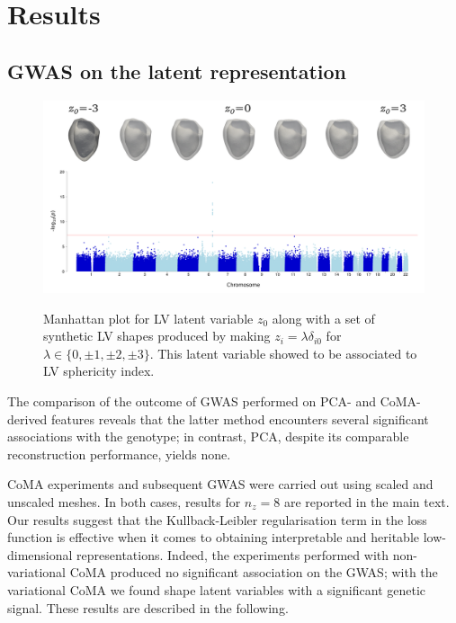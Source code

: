 \section*{Results}
\subsection*{GWAS on the latent representation}
\label{subsec_GWAS}

\begin{figure}[ht!]
\includegraphics[width=\textwidth]{figs/gwas/GWAS_Experiment1_z0_scaled_meshes.png}
\label{fig:manhattan_LV_latent}
\caption{Manhattan plot for LV latent variable $z_0$ along with a set of synthetic LV shapes produced by making $z_i=\lambda \delta_{i0}$ for $\lambda\in\{0, \pm 1, \pm 2, \pm 3\}$. This latent variable showed to be associated to LV sphericity index.}
\end{figure}

The comparison of the outcome of GWAS performed on PCA- and CoMA-derived features reveals that the latter method encounters several significant associations with the genotype; in contrast, PCA, despite its comparable reconstruction performance, yields none. %

CoMA experiments and subsequent GWAS were carried out using scaled and unscaled meshes. In both cases, results for $n_z=8$ are reported in the main text. Our results suggest that the Kullback-Leibler regularisation term in the loss function is effective when it comes to obtaining interpretable and heritable low-dimensional representations. Indeed, the experiments performed with non-variational CoMA produced no significant association on the GWAS; with the variational CoMA we found shape latent variables with a significant genetic signal. These results are described in the following.

